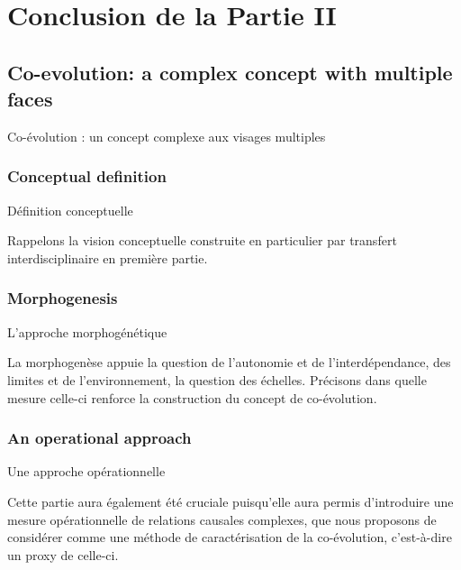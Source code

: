 



\chapter*{Conclusion de la Partie II}








\section*{Co-evolution: a complex concept with multiple faces}{Co-évolution : un concept complexe aux visages multiples}



\subsection*{Conceptual definition}{Définition conceptuelle}


Rappelons la vision conceptuelle construite en particulier par transfert interdisciplinaire en première partie.



\subsection*{Morphogenesis}{L'approche morphogénétique}


La morphogenèse appuie la question de l'autonomie et de l'interdépendance, des limites et de l'environnement, la question des échelles. Précisons dans quelle mesure celle-ci renforce la construction du concept de co-évolution.





\subsection*{An operational approach}{Une approche opérationnelle}


Cette partie aura également été cruciale puisqu'elle aura permis d'introduire une mesure opérationnelle de relations causales complexes, que nous proposons de considérer comme une méthode de caractérisation de la co-évolution, c'est-à-dire un proxy de celle-ci.






